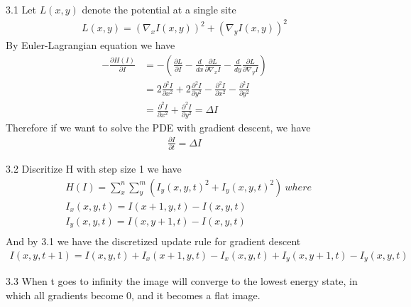 \documentclass[12pt]{article}
\newenvironment{problem}[2][Problem]{\begin{trivlist}
\item[\hskip \labelsep {\bfseries #1}\hskip \labelsep {\bfseries #2}]}{\end{trivlist}}
\begin{document}
\begin{problem}{3.}
\item{3.1} Let $L(x, y)$ denote the potential at a single site
\begin{align*}
	L(x, y) = (\nabla_xI(x,y))^2 + (\nabla_yI(x,y))^2
\end{align*}
By Euler-Lagrangian equation we have
\begin{align*}
	-\frac{\partial H(I)}{\partial I} &= -(\frac{\partial L}{\partial I} - \frac{d}{dx}\frac{\partial L}{\partial \nabla_xI} - \frac{d}{dy}\frac{\partial L}{\partial \nabla_yI})\\
	&= 2\frac{\partial^2 I}{\partial x^2} + 2\frac{\partial^2 I}{\partial y^2} - \frac{\partial^2 I}{\partial x^2} - \frac{\partial^2 I}{\partial y^2} \\
	&=  \frac{\partial^2 I}{\partial x^2} + \frac{\partial^2 I}{\partial y^2} = \Delta I
\end{align*}
Therefore if we want to solve the PDE with gradient descent, we have
\begin{align*}
	\frac{\partial I}{\partial t} = \Delta I 
\end{align*}
\item{3.2} Discritize H with step size 1 we have
\begin{align*}
	&H(I) = \sum_x^{n}\sum_y^{m} (I_y(x,y,t)^2 + I_y(x,y, t)^2) \ where\\
	&I_x(x, y, t) = I(x+1, y, t) - I(x,y, t)\\
	&I_y(x, y, t) = I(x, y+1, t) - I(x,y, t)\\
\end{align*}
And by 3.1 we have the discretized update rule for gradient descent
\begin{align*}
	I(x, y, t+1) = I(x, y, t) +  I_x(x+1, y, t) - I_x(x, y, t) + I_y(x, y+1, t) - I_y(x, y, t)
\end{align*}
\item{3.3} When t goes to infinity the image will converge to the lowest energy state, in which all gradients become 0, and it becomes a flat image.
\end{problem}

 
\end{document}
